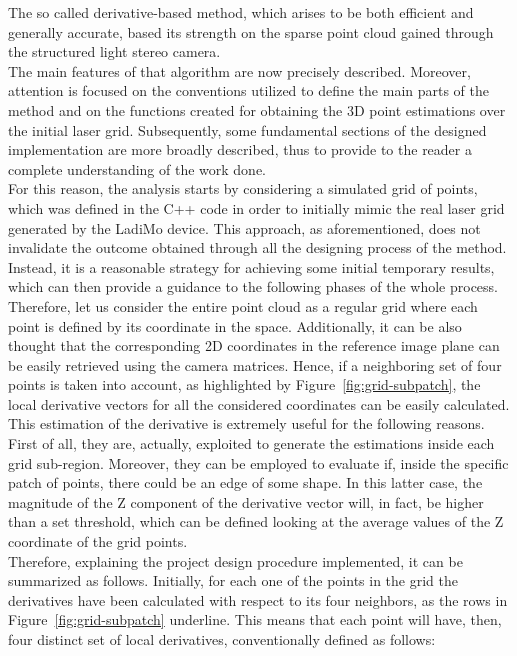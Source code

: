 The so called derivative-based method, which arises to be both efficient and generally accurate, based its strength on the sparse point cloud gained through the structured light stereo camera.\\
The main features of that algorithm are now precisely described.
Moreover, attention is focused on the conventions utilized to define the main parts of the method and on the functions created for obtaining the 3D point estimations over the initial laser grid. 
Subsequently, some fundamental sections of the designed implementation are more broadly described, thus to provide to the reader a complete understanding of the work done. \\
For this reason, the analysis starts by considering a simulated grid of points, which was defined in the C++ code in order to initially mimic the real laser grid generated by the LadiMo device. 
This approach, as aforementioned, does not invalidate the outcome obtained through all the designing process of the method.
Instead, it is a reasonable strategy for achieving some initial temporary results, which can then provide a guidance to the following phases of the whole process.\\
Therefore, let us consider the entire point cloud as a regular grid where each point is defined by its coordinate in the space.
Additionally, it can be also thought that the corresponding 2D coordinates in the reference image plane can be easily retrieved using the camera matrices.
Hence, if a neighboring set of four points is taken into account, as highlighted by Figure~\ref{fig:grid-subpatch}, the local derivative vectors for all the considered coordinates can be easily calculated.
This estimation of the derivative is extremely useful for the following reasons.
First of all, they are, actually, exploited to generate the estimations inside each grid sub-region.
Moreover, they can be employed to evaluate if, inside the specific patch of points, there could be an edge of some shape. 
In this latter case, the magnitude of the Z component of the derivative vector will, in fact, be higher than a set threshold, which can be defined looking at the average values of the Z coordinate of the grid points.\\
Therefore, explaining the project design procedure implemented, it can be summarized as follows.
Initially, for each one of the points in the grid the derivatives have been calculated with respect to its four neighbors, as the rows in Figure~\ref{fig:grid-subpatch} underline. 
This means that each point will have, then, four distinct set of local derivatives, conventionally defined as follows:
